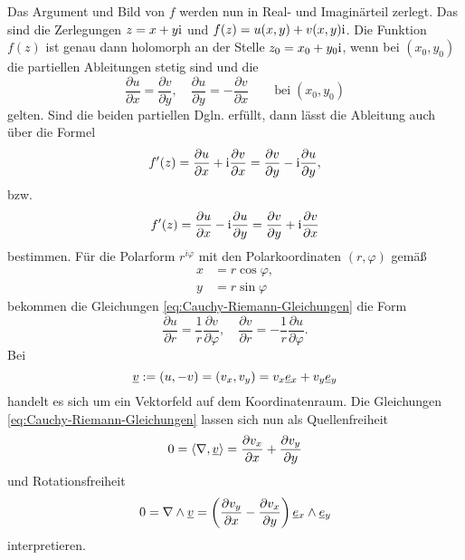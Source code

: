 \noindent
Das Argument und Bild von $f$ werden nun in Real- und Imaginärteil
zerlegt. Das sind die Zerlegungen $z=x+y\mathrm i$ und $f(z)=u(x,y)+v(x,y)\mathrm i$.
Die Funktion $f(z)$ ist genau dann holomorph an der Stelle
$z_0=x_0+y_0\mathrm i$, wenn bei $(x_0,y_0)$ die partiellen Ableitungen
stetig sind und die %
\begin{equation}\label{eq:Cauchy-Riemann-Gleichungen}
\frac{\partial u}{\partial x}=\frac{\partial v}{\partial y},
\quad \frac{\partial u}{\partial y}=-\frac{\partial v}{\partial x}
\qquad\text{bei}\;(x_0,y_0)
\end{equation}
gelten. Sind die beiden partiellen Dgln. erfüllt, dann lässt die
Ableitung auch über die Formel%
\begin{equation}
f'(z) = \frac{\partial u}{\partial x}+\mathrm i\frac{\partial v}{\partial x}
= \frac{\partial v}{\partial y}-\mathrm i\frac{\partial u}{\partial y},
\end{equation}
bzw.
\begin{equation}
f'(z) = \frac{\partial u}{\partial x}-\mathrm i\frac{\partial u}{\partial y}
= \frac{\partial v}{\partial y}+\mathrm i\frac{\partial v}{\partial x}
\end{equation}
bestimmen. Für die Polarform $r^{i\varphi}$ mit den Polarkoordinaten
$(r,\varphi)$ gemäß%
\begin{align}
x &= r\cos\varphi,\\
y &= r\sin\varphi
\end{align}
bekommen die Gleichungen \eqref{eq:Cauchy-Riemann-Gleichungen} die Form
\begin{equation}
\frac{\partial u}{\partial r} = \frac{1}{r}\frac{\partial v}{\partial\varphi}, \quad
\frac{\partial v}{\partial r} = -\frac{1}{r}\frac{\partial u}{\partial\varphi}.
\end{equation}
Bei
\begin{equation}
\underline{v}:= (u,-v) = (v_x,v_y) = v_x\underline{e}{}_x+v_y\underline{e}{}_y
\end{equation}
handelt es sich um ein Vektorfeld
auf dem Koordinatenraum. Die Gleichungen
\eqref{eq:Cauchy-Riemann-Gleichungen} lassen sich nun als
Quellenfreiheit
\begin{equation}
0=\langle\nabla,\underline{v}\rangle = \frac{\partial v_x}{\partial x}+\frac{\partial v_y}{\partial y}
\end{equation}
und Rotationsfreiheit
\begin{equation}
0=\nabla\wedge \underline{v} = \bigg(\frac{\partial v_y}{\partial x}
-\frac{\partial v_x}{\partial y}\bigg)\,\underline{e}{}_x\wedge\underline{e}{}_y
\end{equation}
interpretieren.

